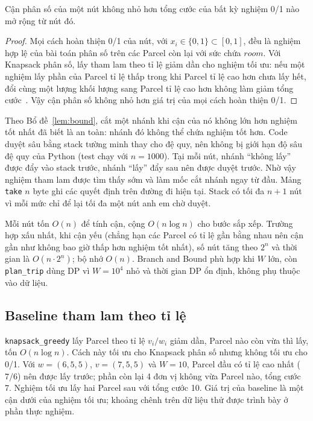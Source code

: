 \begin{lemma}\label{lem:bound}
Cận phân số của một nút không nhỏ hơn tổng cước của bất kỳ nghiệm 0/1 nào mở rộng từ nút đó.
\end{lemma}
\begin{proof}
Mọi cách hoàn thiện 0/1 của nút, với $x_i \in \{0,1\} \subset [0,1]$, đều là nghiệm hợp lệ của bài toán phân số trên các Parcel còn lại với sức chứa $\mathit{room}$. Với Knapsack phân số, lấy tham lam theo tỉ lệ giảm dần cho nghiệm tối ưu: nếu một nghiệm lấy phần của Parcel tỉ lệ thấp trong khi Parcel tỉ lệ cao hơn chưa lấy hết, đổi cùng một lượng khối lượng sang Parcel tỉ lệ cao hơn không làm giảm tổng cước~\cite{clrs2022}. Vậy cận phân số không nhỏ hơn giá trị của mọi cách hoàn thiện 0/1.
\end{proof}

Theo Bổ đề~\ref{lem:bound}, cắt một nhánh khi cận của nó không lớn hơn nghiệm tốt nhất đã biết là an toàn: nhánh đó không thể chứa nghiệm tốt hơn. Code duyệt sâu bằng stack tường minh thay cho đệ quy, nên không bị giới hạn độ sâu đệ quy của Python (test chạy với $n = 1000$). Tại mỗi nút, nhánh ``không lấy'' được đẩy vào stack trước, nhánh ``lấy'' đẩy sau nên được duyệt trước. Nhờ vậy nghiệm tham lam được tìm thấy sớm và làm mốc cắt nhánh ngay từ đầu. Mảng \texttt{take} $n$ byte ghi các quyết định trên đường đi hiện tại. Stack có tối đa $n+1$ nút vì mỗi mức chỉ để lại tối đa một nút anh em chờ duyệt.

Mỗi nút tốn $O(n)$ để tính cận, cộng $O(n \log n)$ cho bước sắp xếp. Trường hợp xấu nhất, khi cận yếu (chẳng hạn các Parcel có tỉ lệ gần bằng nhau nên cận gần như không bao giờ thấp hơn nghiệm tốt nhất), số nút tăng theo $2^n$ và thời gian là $O(n \cdot 2^n)$; bộ nhớ $O(n)$. Branch and Bound phù hợp khi $W$ lớn, còn \texttt{plan\_trip} dùng DP vì $W = 10^4$ nhỏ và thời gian DP ổn định, không phụ thuộc vào dữ liệu.

\subsection{Baseline tham lam theo tỉ lệ}

\texttt{knapsack\_greedy} lấy Parcel theo tỉ lệ $v_i / w_i$ giảm dần, Parcel nào còn vừa thì lấy, tốn $O(n \log n)$. Cách này tối ưu cho Knapsack phân số nhưng không tối ưu cho 0/1. Với $w = (6, 5, 5)$, $v = (7, 5, 5)$ và $W = 10$, Parcel đầu có tỉ lệ cao nhất ($7/6$) nên được lấy trước; phần còn lại 4 đơn vị không vừa Parcel nào, tổng cước 7. Nghiệm tối ưu lấy hai Parcel sau với tổng cước 10. Giá trị của baseline là một cận dưới của nghiệm tối ưu; khoảng chênh trên dữ liệu thử được trình bày ở phần thực nghiệm.

